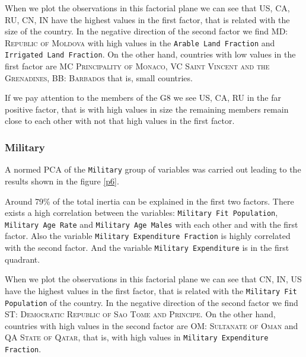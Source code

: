 \documentclass[a4paper,10pt,twocolumn]{article}
\begin{document}
When we plot the observations in this factorial plane we can see that \textsc{US, CA, RU, CN, IN} have the highest values in the first factor, that is related with the size of the country. In the negative direction of the second factor we find \textsc{MD: Republic of Moldova}  with high values in the \texttt{Arable Land Fraction} and \texttt{Irrigated Land Fraction}. On the other hand, countries with low values in the first factor are \textsc{MC	Principality of Monaco}, \textsc{VC	Saint Vincent and the Grenadines}, \textsc{BB: Barbados
} that is, small countries.


If we pay attention to the members of the \textsc{G8} we see \textsc{US, CA, RU} in the far positive factor, that is with high values in size the remaining members remain close to each other with not that high values in the first factor.

\subsubsection{Military}

A normed PCA of the \texttt{Military} group of variables was carried out leading to the results shown in the figure \ref{p6}. 

Around 79\% of the total inertia can be explained in the first two factors. There exists a high correlation between the variables: \texttt{Military Fit Population}, \texttt{Military Age Rate} and \texttt{Military Age Males} with each other and with the first factor. Also the variable \texttt{Military Expenditure Fraction} is highly correlated with the second factor. And the variable \texttt{Military Expenditure} is  in the first quadrant. 

When we plot the observations in this factorial plane we can see that \textsc{CN, IN, US} have the highest values in the first factor, that is related with the \texttt{Military Fit Population} of the country. In the negative direction of the second factor we find \textsc{ST: Democratic Republic of Sao Tome and Principe}. On the other hand, countries with high values in the second factor are \textsc{OM: Sultanate of Oman} and \textsc{QA	State of Qatar},  that is, with high values in \texttt{Military Expenditure Fraction}.
\end{document}

